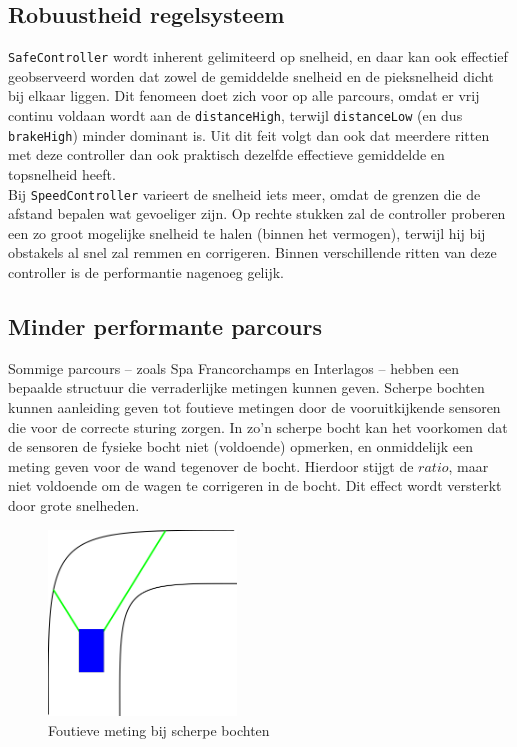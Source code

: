 \documentclass[10pt,a4paper]{article}
\begin{document}
		\subsection{Robuustheid regelsysteem}
			\texttt{SafeController} wordt inherent gelimiteerd op snelheid, en daar kan ook effectief geobserveerd worden dat zowel de gemiddelde snelheid en de pieksnelheid dicht bij elkaar liggen. Dit fenomeen doet zich voor op alle parcours, omdat er vrij continu voldaan wordt aan de \texttt{distanceHigh}, terwijl \texttt{distanceLow} (en dus \texttt{brakeHigh}) minder dominant is. Uit dit feit volgt dan ook dat meerdere ritten met deze controller dan ook praktisch dezelfde effectieve gemiddelde en topsnelheid heeft.\\

			Bij \texttt{SpeedController} varieert de snelheid iets meer, omdat de grenzen die de afstand bepalen wat gevoeliger zijn. Op rechte stukken zal de controller proberen een zo groot mogelijke snelheid te halen (binnen het vermogen), terwijl hij bij obstakels al snel zal remmen en corrigeren. Binnen verschillende ritten van deze controller is de performantie nagenoeg gelijk.\\

		\subsection{Minder performante parcours}
			Sommige parcours -- zoals Spa Francorchamps en Interlagos -- hebben een bepaalde structuur die verraderlijke metingen kunnen geven. Scherpe bochten kunnen aanleiding geven tot foutieve metingen door de vooruitkijkende sensoren die voor de correcte sturing zorgen. In zo'n scherpe bocht kan het voorkomen dat de sensoren de fysieke bocht niet (voldoende) opmerken, en onmiddelijk een meting geven voor de wand tegenover de bocht. Hierdoor stijgt de $ratio$, maar niet voldoende om de wagen te corrigeren in de bocht. Dit effect wordt versterkt door grote snelheden.

			\begin{figure}[h]
				\centering
				\includegraphics[width=5cm]{sensors-corner.png}
				\caption{Foutieve meting bij scherpe bochten}
				\label{fig:sensors-corner}
			\end{figure}
\end{document}
